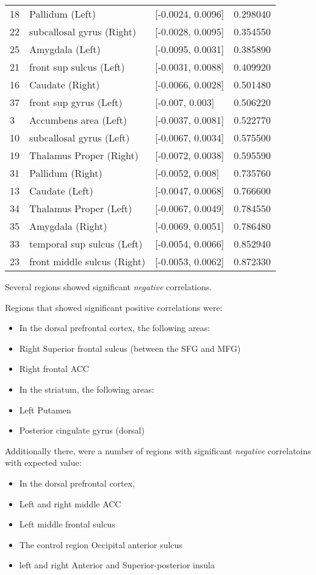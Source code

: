 \documentclass[]{article}
\providecommand{\tightlist}{%
  \setlength{\itemsep}{0pt}\setlength{\parskip}{0pt}}
\begin{document}
\begin{longtable}[]{@{}lllr@{}}
18 & Pallidum (Left) & {[}-0.0024, 0.0096{]} & 0.298040\tabularnewline
22 & subcallosal gyrus (Right) & {[}-0.0028, 0.0095{]} &
0.354550\tabularnewline
25 & Amygdala (Left) & {[}-0.0095, 0.0031{]} & 0.385890\tabularnewline
21 & front sup sulcus (Left) & {[}-0.0031, 0.0088{]} &
0.409920\tabularnewline
16 & Caudate (Right) & {[}-0.0066, 0.0028{]} & 0.501480\tabularnewline
37 & front sup gyrus (Left) & {[}-0.007, 0.003{]} &
0.506220\tabularnewline
3 & Accumbens area (Left) & {[}-0.0037, 0.0081{]} &
0.522770\tabularnewline
10 & subcallosal gyrus (Left) & {[}-0.0067, 0.0034{]} &
0.575500\tabularnewline
19 & Thalamus Proper (Right) & {[}-0.0072, 0.0038{]} &
0.595590\tabularnewline
31 & Pallidum (Right) & {[}-0.0052, 0.008{]} & 0.735760\tabularnewline
13 & Caudate (Left) & {[}-0.0047, 0.0068{]} & 0.766600\tabularnewline
34 & Thalamus Proper (Left) & {[}-0.0067, 0.0049{]} &
0.784550\tabularnewline
35 & Amygdala (Right) & {[}-0.0069, 0.0051{]} & 0.786480\tabularnewline
33 & temporal sup sulcus (Left) & {[}-0.0054, 0.0066{]} &
0.852940\tabularnewline
23 & front middle sulcus (Right) & {[}-0.0053, 0.0062{]} &
0.872330\tabularnewline
\bottomrule
\end{longtable}

Several regions showed significant \emph{negative} correlations.

Regions that showed significant positive correlations were:

\begin{itemize}
\tightlist
\item
  In the dorsal prefrontal cortex, the following areas:
\item
  Right Superior frontal sulcus (between the SFG and MFG)
\item
  Right frontal ACC
\item
  In the striatum, the following areas:
\item
  Left Putamen
\item
  Posterior cingulate gyrus (dorsal)
\end{itemize}

Additionally there, were a number of regions with significant
\emph{negative} correlatoins with expected value:

\begin{itemize}
\tightlist
\item
  In the dorsal prefrontal cortex,
\item
  Left and right middle ACC
\item
  Left middle frontal sulcus
\item
  The control region Occipital anterior sulcus
\item
  left and right Anterior and Superior-posterior insula
\end{itemize}
\end{document}

